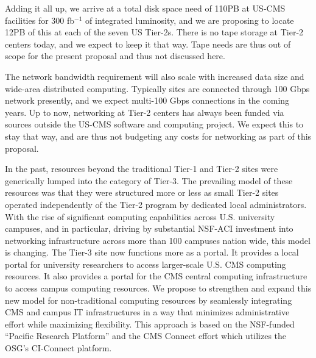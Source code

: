 \documentclass[11pt,a4paper]{article}
\begin{document}
Adding it all up, we arrive at a total disk space need of 110PB at US-CMS facilities for 300 fb$^{-1}$ of integrated luminosity, 
and we are proposing to locate 12PB of this at each of the seven US Tier-2s.
There is no tape storage at Tier-2 centers today, and we expect to keep it that way. Tape needs are thus out of scope for the present proposal
and thus not discussed here.


The network bandwidth requirement will also scale with increased data
size and wide-area distributed computing.  Typically sites are
connected through 100 Gbps network presently, and we expect
multi-100 Gbps connections in the coming years. Up to now, networking at Tier-2 centers has always been funded
via sources outside the US-CMS software and computing project. We expect this to stay that way, and are thus not budgeting
any costs for networking as part of this proposal.


In the past, resources beyond the traditional Tier-1 and Tier-2 sites were generically lumped into the category of Tier-3.  The prevailing model of these resources was that they were structured more or less as small Tier-2 sites operated independently of the Tier-2 program by dedicated local administrators.  With the rise of significant computing capabilities across U.S. university campuses, and in particular, driving by substantial NSF-ACI investment into networking infrastructure across more than 100 campuses nation wide, this model is changing.  The Tier-3 site now functions more as a portal.  It provides a local portal for university researchers to access larger-scale U.S. CMS computing resources.  It also provides a portal for the CMS central computing infrastructure to access campus computing resources.  We propose to strengthen and expand this new model for non-traditional computing resources by seamlessly integrating CMS and campus IT infrastructures in a way that minimizes administrative effort while maximizing flexibility.  This approach is based on the NSF-funded ``Pacific Research Platform'' and the CMS Connect effort which utilizes the OSG's CI-Connect platform.
\end{document}
